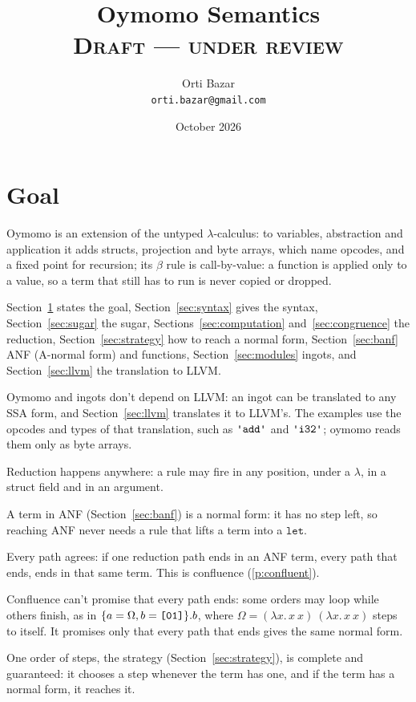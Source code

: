\documentclass[11pt,letterpaper]{article}
\title{Oymomo Semantics\\[8pt]\normalsize\textsc{Draft --- under review}}
\author{Orti Bazar\\ \texttt{orti.bazar@gmail.com}}
\date{October 2026}
\newcommand{\lam}[2]{\lambda #1.\,#2}       %
\newcommand{\kw}[1]{\mathtt{#1}}
\newcommand{\str}[1]{\text{\ttfamily\textquotesingle #1\textquotesingle}}  %
\newcommand{\hex}[1]{\text{\ttfamily [#1]}}  %
\newcommand{\pref}[1]{\ref{#1}}  %
\begin{document}
\maketitle






\section{Goal}\label{sec:goal}

\begin{points}
\item Oymomo is an extension of the untyped $\lambda$-calculus: to variables, abstraction and
  application it adds structs, projection and byte arrays, which name
  opcodes, and a fixed point for recursion; its $\beta$ rule is call-by-value: a function is applied only to a value, so a term that still has to run is never copied or dropped.
\item Section~\ref{sec:goal} states the goal, Section~\ref{sec:syntax} gives the syntax, Section~\ref{sec:sugar} the sugar,
  Sections~\ref{sec:computation} and~\ref{sec:congruence} the reduction, Section~\ref{sec:strategy} how to reach a normal form, Section~\ref{sec:banf} ANF (A-normal form) and functions, Section~\ref{sec:modules} ingots, and Section~\ref{sec:llvm} the translation to LLVM.
\item Oymomo and ingots don't depend on LLVM: an ingot can be translated to any SSA form, and
  Section~\ref{sec:llvm} translates it to LLVM's. The examples use the opcodes and
  types of that translation, such as $\str{add}$ and $\str{i32}$; oymomo reads them only as byte arrays.
\item\label{p:goal-anywhere} Reduction happens anywhere: a rule may fire in any position, under a
  $\lambda$, in a struct field and in an argument.
\item\label{p:goal-banf} A term in ANF (Section~\ref{sec:banf}) is a normal form: it
  has no step left, so reaching ANF never needs a rule that lifts a term into a $\kw{let}$.
\item\label{p:goal-agree} Every path agrees: if one reduction path ends in an ANF term, every path that ends,
  ends in that same term. This is confluence (\pref{p:confluent}).
\item\label{p:goal-ends} Confluence can't promise that every path ends:  some orders may loop while
  others finish, as in $\{a = \Omega, b = \hex{01}\}.b$, where $\Omega = (\lam{x}{x\ x})\ (\lam{x}{x\ x})$ steps to itself. It promises only that every path that ends gives the same normal form.
\item\label{p:goal-strategy} One order of steps, the strategy (Section~\ref{sec:strategy}), is complete and guaranteed: it
  chooses a step whenever the term has one, and if the term has a normal form, it reaches it.
\end{points}
\end{document}
